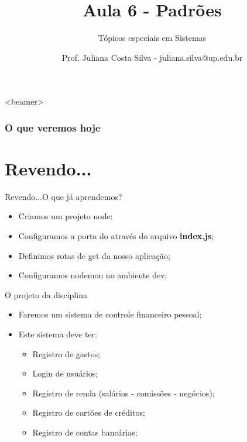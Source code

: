 \documentclass{beamer}
\title{Aula 6  - Padrões}
\subtitle{Tópicos especiais em Sistemas}
\author{Prof. Juliana Costa Silva - juliana.silva@up.edu.br}
\begin{document}
  \frame[c]{\maketitle}
      \begin{frame}<beamer>
      \frametitle{O que veremos hoje}
      \tableofcontents
    \end{frame}
    \section{Revendo...}
    \begin{frame}{Revendo...}{O que já aprendemos?}
      
      \begin{itemize}
            \item Criamos um projeto node;
            \item Configuramos a porta do através do arquivo \textbf{index.js};
            \item Definimos rotas de get da nosso aplicação;
            \item Configuramos nodemon no ambiente dev;
       \end{itemize}
     \end{frame}
\begin{frame}[label=proof]{O projeto da disciplina}
	\begin{itemize}
	\item Faremos um sistema de controle financeiro pessoal;
	\item Este sistema deve ter:
	\begin{itemize}
	\item Registro de gastos;
	\item Login de usuários;
	\item Registro de renda (salários - comissões - negócios);
	\item Registro de cartões de créditos;
	\item Registro de contas bancárias;
	\end{itemize}
	\end{itemize}
    \end{frame}
\end{document}
